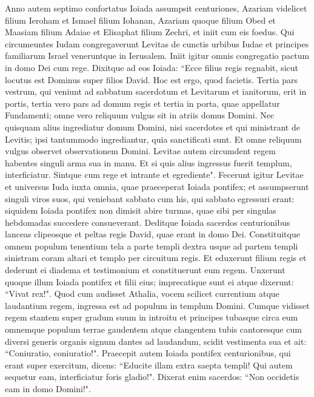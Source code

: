 \begin{biblechapter}  
\verse Anno autem septimo confortatus Ioiada assumpsit centuriones, Azariam videlicet filium Ieroham et Ismael filium Iohanan, Azariam quoque filium Obed et Maasiam filium Adaiae et Elisaphat filium Zechri, et iniit cum eis foedus. 
\verse Qui circumeuntes Iudam congregaverunt Levitas de cunctis urbibus Iudae et principes familiarum Israel veneruntque in Ierusalem. 
\verse Iniit igitur omnis congregatio pactum in domo Dei cum rege. Dixitque ad eos Ioiada: “Ecce filius regis regnabit, sicut locutus est Dominus super filios David. 
\verse Hoc est ergo, quod facietis. 
\verse Tertia pars vestrum, qui veniunt ad sabbatum sacerdotum et Levitarum et ianitorum, erit in portis, tertia vero pars ad domum regis et tertia in porta, quae appellatur Fundamenti; omne vero reliquum vulgus sit in atriis domus Domini. 
\verse Nec quisquam alius ingrediatur domum Domini, nisi sacerdotes et qui ministrant de Levitis; ipsi tantummodo ingrediantur, quia sanctificati sunt. Et omne reliquum vulgus observet observationem Domini. 
\verse Levitae autem circumdent regem habentes singuli arma sua in manu. Et si quis alius ingressus fuerit templum, interficiatur. Sintque cum rege et intrante et egrediente". 
\verse Fecerunt igitur Levitae et universus Iuda iuxta omnia, quae praeceperat Ioiada pontifex; et assumpserunt singuli viros suos, qui veniebant sabbato cum his, qui sabbato egressuri erant: siquidem Ioiada pontifex non dimisit abire turmas, quae sibi per singulas hebdomadas succedere consueverant. 
\verse Deditque Ioiada sacerdos centurionibus lanceas clipeosque et peltas regis David, quae erant in domo Dei. 
\verse Constituitque omnem populum tenentium tela a parte templi dextra usque ad partem templi sinistram coram altari et templo per circuitum regis. 
\verse Et eduxerunt filium regis et dederunt ei diadema et testimonium et constituerunt eum regem. Unxerunt quoque illum Ioiada pontifex et filii eius; imprecatique sunt ei atque dixerunt: “Vivat rex!". 
\verse Quod cum audisset Athalia, vocem scilicet currentium atque laudantium regem, ingressa est ad populum in templum Domini. 
\verse Cumque vidisset regem stantem super gradum suum in introitu et principes tubasque circa eum omnemque populum terrae gaudentem atque clangentem tubis cantoresque cum diversi generis organis signum dantes ad laudandum, scidit vestimenta sua et ait: “Coniuratio, coniuratio!". 
\verse Praecepit autem Ioiada pontifex centurionibus, qui erant super exercitum, dicens: “Educite illam extra saepta templi! Qui autem sequetur eam, interficiatur foris gladio!". Dixerat enim sacerdos: “Non occidetis eam in domo Domini!". 

\end{biblechapter}
